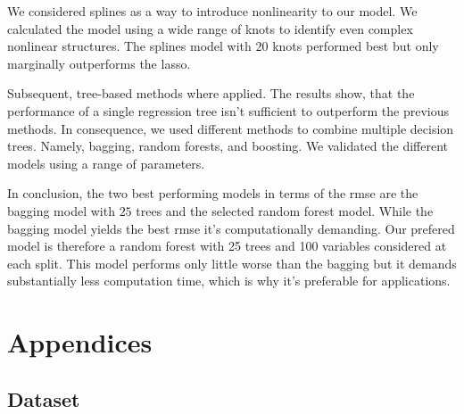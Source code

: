 \documentclass[11pt,]{article}
\begin{document}
We considered splines as a way to introduce nonlinearity to our model.
We calculated the model using a wide range of knots to identify even
complex nonlinear structures. The splines model with \(20\) knots
performed best but only marginally outperforms the \ac{lasso}.

Subsequent, tree-based methods where applied. The results show, that the
performance of a single regression tree isn't sufficient to outperform
the previous methods. In consequence, we used different methods to
combine multiple decision trees. Namely, bagging, random forests, and
boosting. We validated the different models using a range of parameters.

In conclusion, the two best performing models in terms of the \ac{rmse}
are the bagging model with \(25\) trees and the selected random forest
model. While the bagging model yields the best \ac{rmse} it's
computationally demanding. Our prefered model is therefore a random
forest with 25 trees and 100 variables considered at each split. This
model performs only little worse than the bagging but it demands
substantially less computation time, which is why it's preferable for
applications.

\pagebreak

\printbibliography[title = References]
\cleardoublepage

\begin{refsection}
\nocite{R-base}
\nocite{R-broom}
\nocite{R-dplyr}
\nocite{R-ggplot2}
\nocite{R-haven}
\nocite{R-lmtest}
\nocite{R-PerformanceAnalytics}
\nocite{R-rstudioapi}
\nocite{R-sandwich}
\nocite{R-stargazer}
\nocite{R-svMisc}
\nocite{R-tidyr}
\nocite{R-xts}
\nocite{R-Studio}
\printbibliography[title = Software-References]
\end{refsection}

\cleardoublepage
\appendix
\setcounter{table}{0}
\setcounter{figure}{0}
\renewcommand{\thetable}{A\arabic{table}}
\renewcommand{\thefigure}{A\arabic{figure}}

\hypertarget{appendices}{%
\section{Appendices}\label{appendices}}

\hypertarget{dataset}{%
\subsection{\texorpdfstring{Dataset
\label{chap:ap1}}{Dataset }}\label{dataset}}
\end{document}
